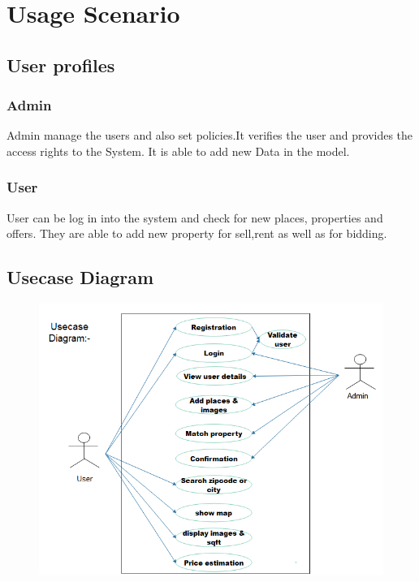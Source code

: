 \documentclass[11pt,fleqn]{book} %
\begin{document}
\section{Usage Scenario}
\subsection{User profiles}
\subsubsection{Admin} Admin manage the users and also set policies.It verifies the user and provides the access rights to the System. It is able to add new Data in the model.
\subsubsection{User} User can be log in into the system and check for new places, properties and offers. They are able to add new property for sell,rent as well as for bidding.

\newpage
\subsection{Usecase Diagram}
\begingroup
\begin{center}
    \begin{figure}[!ht]
        \centering
        \includegraphics{Pictures/usecase.png}
        \label{fig:my_label}
    \end{figure}
\end{center}
\endgroup
\end{document}
